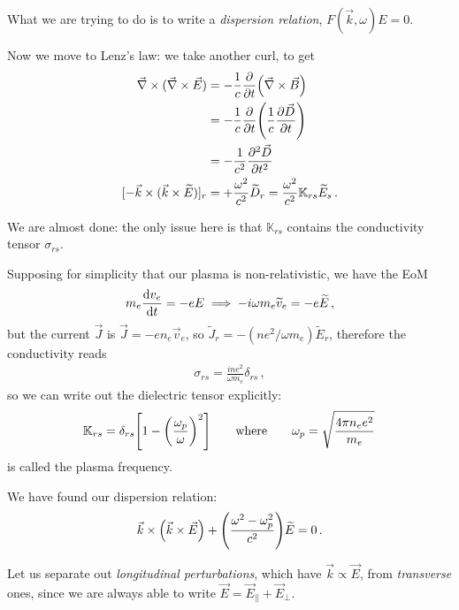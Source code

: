 \documentclass[main.tex]{subfiles}
\begin{document}
What we are trying to do is to write a \emph{dispersion relation}, \(F(\vec{k}, \omega ) E = 0\). 

Now we move to Lenz's law: we take another curl, to get 
%
\begin{subequations}
\begin{align}
\vec{\nabla} \times (\vec{\nabla} \times \vec{E}) &= - \frac{1}{c} \pdv{}{t} \qty(\vec{\nabla} \times \vec{B})   \\
&= - \frac{1}{c} \pdv{}{t} \qty( \frac{1}{c}\pdv{\vec{D}}{t})  \\
&= - \frac{1}{c^2} \pdv[2]{\vec{D}}{t}  \\
[- \vec{k} \times (\vec{k} \times \widetilde{E})]_r &= + \frac{\omega^2}{c^2} \widetilde{D}_r = \frac{\omega^2}{c^2} \mathbb{K}_{rs} \widetilde{E}_s
\,.
\end{align}
\end{subequations}

We are almost done: the only issue here is that \(\mathbb{K}_{rs}\) contains the conductivity tensor \(\sigma_{rs}\). 

Supposing for simplicity  that our plasma is non-relativistic, we have the EoM 
%
\begin{align}
m_e \dv{v_e}{t} = - e E \implies 
- i \omega m_e \widetilde{v}_e = - e \widetilde{E}
\,,
\end{align}
%
but the current \(\vec{J}\) is \(\vec{J} = - e n_e \vec{v}_e\), so \(\widetilde{J}_r = - (n e^2 / \omega m_e) \widetilde{E}_r\), therefore the conductivity reads 
%
\begin{align}
\sigma_{rs} = \frac{i n e^2}{\omega m_e} \delta_{rs} 
\,,
\end{align}
%
so we can write out the dielectric tensor explicitly: 
%
\begin{align}
\mathbb{K}_{rs} = \delta_{rs} \qty[ 1 - \qty(\frac{\omega_p}{\omega })^2]
\qquad \text{where} \qquad
\omega_p = \sqrt{\frac{ 4 \pi n_e e^2}{m_e}}
\,
\end{align}
%
is called the plasma frequency.

We have found our dispersion relation: 
%
\begin{align}
\vec{k} \times \qty(\vec{k} \times \vec{E})
+ \qty(\frac{\omega^2 - \omega _p^2}{c^2}) \widetilde{E} = 0
\,.
\end{align}

Let us separate out \emph{longitudinal perturbations}, which have \(\vec{k} \propto \vec{E}\), from \emph{transverse} ones, since we are always able to write \(\vec{E} = \vec{E}_\parallel + \vec{E}_\perp\). 
\end{document}
